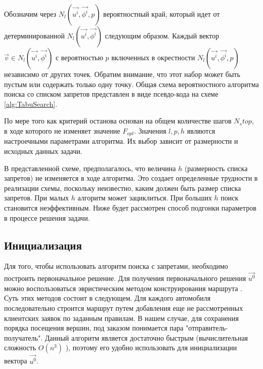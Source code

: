 \documentclass[]{TAACpaper}
\begin{document}
Обозначим через $N_l(\vec{u^i},\vec{\phi^i},p)$ вероятностный край, который идет от детерминированной $N_l(\vec{u^i},\vec{\phi^i})$ следующим образом. Каждый вектор $\vec{v} \in N_l(\vec{u^i},\vec{\phi^i})$ с вероятностью $p$ включенных в окрестности $N_l(\vec{u^i},\vec{\phi^i},p)$ независимо от других точек. Обратим внимание, что этот набор может быть пустым или содержать только одну точку. Общая схема вероятностного алгоритма поиска со списком запретов представлен в виде псевдо-кода на схеме \ref{alg:TabuSearch}.

По мере того как критерий останова основан на общем количестве шагов  $N_stop$,  в ходе которого не изменяет значение $F_{opt}$. Значения $l,p,h$ являются настроечными параметрами алгоритма. Их выбор зависит от размерности и исходных данных задачи.

В представленной схеме, предполагалось, что величина $h$ (размерность списка запретов)  не изменяется в ходе алгоритма. Это создает определенные трудности в реализации схемы, поскольку неизвестно, каким должен быть размер списка запретов. При малых $h$ алгоритм может зациклиться. При больших  $h$ поиск становится неэффективным. Ниже будет рассмотрен способ подгонки параметров в процессе решения задачи. 

\subsection{Инициализация}
Для того, чтобы использовать алгоритм поиска с запретами, необходимо построить первоначальное решение. Для получения первоначального решения $\vec{u^0}$ можно воспользоваться эвристическим методом конструирования маршрута \cite{Cordeau2001,Braysy} . Суть этих методов состоит в следующем. Для каждого автомобиля последовательно строится маршрут путем добавления еще не рассмотренных клиентских заявок по заданным правилам. В нашем случае, для сохранения порядка посещения вершин, под заказом понимается пара "отправитель-получатель". Данный алгоритм является достаточно быстрым (вычислительная сложность $O(n^3)$ \cite{Babb}), поэтому его удобно использовать для инициализации вектора $\vec{u^0}$.
\end{document}
